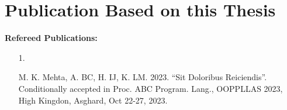 \chapter*{Publication Based on this Thesis}
\textbf{Refereed Publications:}\\
\begin{enumerate}\itemsep0.5em
    \item[1.] \begin{normalsize}M. K. Mehta, A. BC, H. IJ, K. LM. 2023. 
        ``Sit Doloribus Reiciendis''. Conditionally accepted in Proc. ABC Program. Lang., OOPPLLAS 2023, High Kingdon, Asghard, Oct 22-27, 2023.\end{normalsize}
    \end{enumerate}